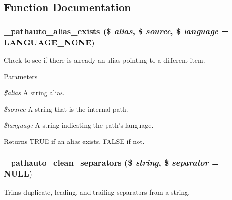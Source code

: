 \subsection{Function Documentation}
\hypertarget{pathauto_8inc_add7c5186fb921739f6cccd5cf2a2c82a}{
\subsubsection[{\_\-pathauto\_\-alias\_\-exists}]{\setlength{\rightskip}{0pt plus 5cm}\_\-pathauto\_\-alias\_\-exists (\$ {\em alias}, \/  \$ {\em source}, \/  \$ {\em language} = {\ttfamily LANGUAGE\_\-NONE})}}
\label{pathauto_8inc_add7c5186fb921739f6cccd5cf2a2c82a}
Check to see if there is already an alias pointing to a different item.


\begin{DoxyParams}{Parameters}
\item[{\em \$alias}]A string alias. \item[{\em \$source}]A string that is the internal path. \item[{\em \$language}]A string indicating the path's language. \end{DoxyParams}
\begin{DoxyReturn}{Returns}
TRUE if an alias exists, FALSE if not. 
\end{DoxyReturn}
\hypertarget{pathauto_8inc_a84df3a794eb1448559c84aae690b4eb3}{
\subsubsection[{\_\-pathauto\_\-clean\_\-separators}]{\setlength{\rightskip}{0pt plus 5cm}\_\-pathauto\_\-clean\_\-separators (\$ {\em string}, \/  \$ {\em separator} = {\ttfamily NULL})}}
\label{pathauto_8inc_a84df3a794eb1448559c84aae690b4eb3}
Trims duplicate, leading, and trailing separators from a string.



